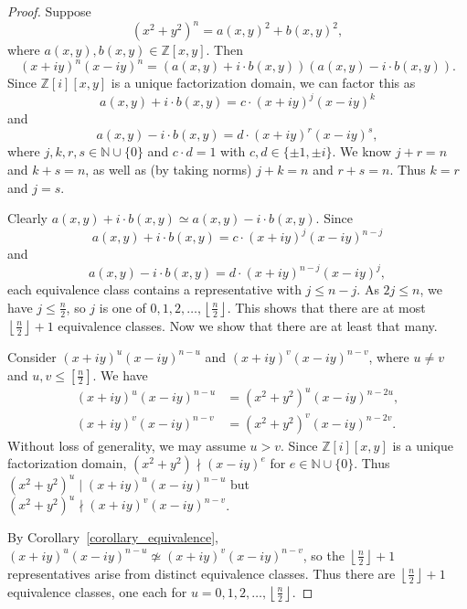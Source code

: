 \documentclass[12pt,table]{article}
\theoremstyle{definition}
\theoremstyle{remark}
\newcommand{\Nnn}{\mathbb N}
\newcommand{\Zzz}{\mathbb Z}
\newcommand{\divides}{\mid}
\newcommand{\notdivides}{\nmid}
\numberwithin{equation}{section}
\begin{document}
\begin{proof}
Suppose 
\[
(x^2 + y^2)^n = a(x,y)^2 + b(x,y)^2,
\]
where $ a(x,y), b(x,y) \in \Zzz[x,y] $.
Then  
\[
(x + iy)^n (x -  iy)^n = ( a(x,y) + i \cdot b(x,y) ) ( a(x,y) - i \cdot b(x,y) ) .
\]
Since $ \Zzz [i][x,y] $ is a unique factorization domain,
we can factor this as
\[
a(x,y) + i \cdot b(x,y) = c \cdot (x + iy)^j (x -  iy)^k
\]
and
\[
a(x,y) - i \cdot b(x,y) = d \cdot (x + iy)^r (x -  iy)^s,
\]
where $ j, k, r, s \in \Nnn \cup \{0\} $ and
$c \cdot d = 1 $ with $ c,d \in \{ \pm 1 , \pm i \} $. 
We know $ j + r = n $ and $ k + s = n $, as well as
(by taking norms) $ j + k = n $ and $ r + s = n $.
Thus $k = r$ and $j = s$.

Clearly $ a(x,y) + i \cdot b(x,y) \simeq  a(x,y) - i \cdot b(x,y) $.
Since 
\[ 
a(x,y) + i \cdot b(x,y) = c \cdot (x + iy)^j (x -  iy)^{n-j} 
\]
and 
\[ 
a(x,y) - i \cdot b(x,y) = d \cdot (x + iy)^{n-j} (x -  iy)^j,
\]
each equivalence class contains a representative with $ j \leq n - j
$.  As $ 2j \leq n $, we have $ j \leq \frac{n}{2} $, so $ j $
is one of $ 0, 1, 2, \ldots, \left\lfloor \frac{n}{2} \right\rfloor $. This shows
that there are at most $ \left\lfloor \frac{n}{2} \right\rfloor + 1 $
equivalence classes. Now we show that there are at least that many.



Consider $ (x + iy)^u (x -  iy)^{n-u} $  and $ (x + iy)^v (x -  iy)^{n-v} $,
where $ u \neq v $ and $u,v \leq [ \frac{n}{2} ] $. We have
\begin{align*}
(x + iy)^u (x -  iy)^{n-u} &= (x^2 + y^2)^u (x -  iy)^{n-2u},
\\
(x + iy)^v (x -  iy)^{n-v} &= (x^2 + y^2)^v (x -  iy)^{n-2v}.
\end{align*}
Without loss of generality, we may assume $ u > v $. 
Since $ \Zzz [i][x,y] $ is a unique factorization domain,
$ (x^2 + y^2) \notdivides (x -  iy)^e $ for $ e \in \Nnn \cup \{ 0 \} $.
Thus $ (x^2 + y^2)^u \divides (x + iy)^u (x -  iy)^{n-u} $
but $ (x^2 + y^2)^u \notdivides (x + iy)^v (x -  iy)^{n-v} $.

By Corollary~\ref{corollary_equivalence},
$ (x + iy)^u (x -  iy)^{n-u} \not\simeq (x + iy)^v (x -  iy)^{n-v} $, 
so the $ \left\lfloor \frac{n}{2} \right\rfloor + 1 $ representatives arise from
distinct equivalence classes.
Thus there are $ \left\lfloor \frac{n}{2} \right\rfloor + 1 $ equivalence classes, 
one each for $ u = 0, 1, 2, \ldots,  \left\lfloor \frac{n}{2} \right\rfloor $.
\end{proof}
\end{document}
